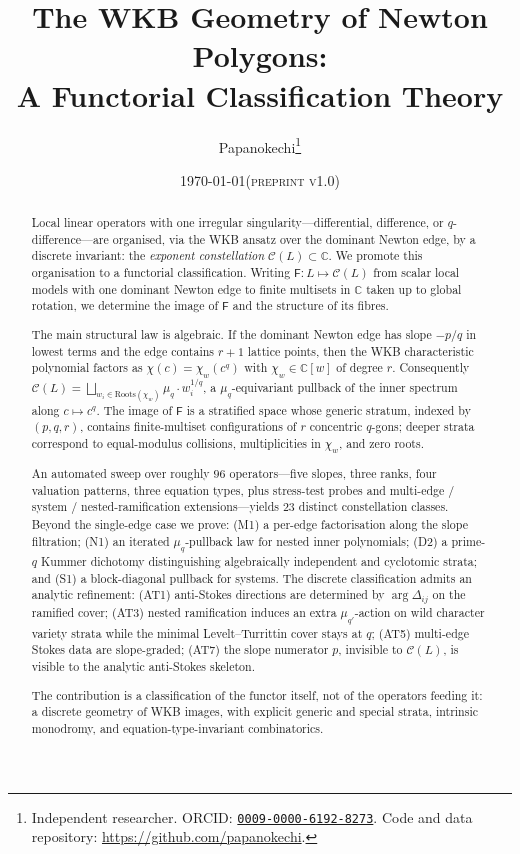 \documentclass[11pt,a4paper]{article}
\title{The WKB Geometry of Newton Polygons:\\
       A Functorial Classification Theory}
\author{%
  Papanokechi\thanks{Independent researcher. ORCID:
  \href{https://orcid.org/0009-0000-6192-8273}{\texttt{0009-0000-6192-8273}}.
  Code and data repository:
  \url{https://github.com/papanokechi}.}
}
\date{\today\hspace{1ex}\textsc{(preprint v1.0)}}
\theoremstyle{plain}
\theoremstyle{definition}
\theoremstyle{remark}
\newcommand{\Roots}{\mathrm{Roots}}
\newcommand{\Cl}{\mathcal{C}}
\newcommand{\Fclass}{\mathsf{F}}
\newcommand{\Dij}{\Delta_{ij}}
\begin{document}
\maketitle

\begin{abstract}
Local linear operators with one irregular singularity---differential,
difference, or $q$-difference---are organised, via the WKB ansatz over the
dominant Newton edge, by a discrete invariant: the \emph{exponent
constellation} $\Cl(L) \subset \mathbb{C}$. We promote this organisation to
a functorial classification. Writing
$\Fclass \colon L \mapsto \Cl(L)$ from scalar local models with one dominant
Newton edge to finite multisets in $\mathbb{C}$ taken up to global rotation,
we determine the image of $\Fclass$ and the structure of its fibres.

The main structural law is algebraic. If the dominant Newton edge has slope
$-p/q$ in lowest terms and the edge contains $r{+}1$ lattice points, then
the WKB characteristic polynomial factors as
$\chi(c) = \chi_w(c^q)$ with $\chi_w \in \mathbb{C}[w]$ of degree $r$.
Consequently
$\Cl(L) = \bigsqcup_{w_i \in \Roots(\chi_w)} \mu_q \cdot w_i^{1/q}$,
a $\mu_q$-equivariant pullback of the inner spectrum along $c \mapsto c^q$.
The image of $\Fclass$ is a stratified space whose generic stratum, indexed
by $(p, q, r)$, contains finite-multiset configurations of $r$ concentric
$q$-gons; deeper strata correspond to equal-modulus collisions, multiplicities
in $\chi_w$, and zero roots.

An automated sweep over roughly $96$ operators---five slopes, three ranks,
four valuation patterns, three equation types, plus stress-test probes and
multi-edge / system / nested-ramification extensions---yields \textbf{$23$}
distinct constellation classes. Beyond the single-edge case we prove:
(M1) a per-edge factorisation along the slope filtration; (N1) an iterated
$\mu_q$-pullback law for nested inner polynomials; (D2) a prime-$q$ Kummer
dichotomy distinguishing algebraically independent and cyclotomic strata;
and (S1) a block-diagonal pullback for systems. The discrete classification
admits an analytic refinement: (AT1) anti-Stokes directions are determined
by $\arg \Dij$ on the ramified cover; (AT3) nested ramification induces an
extra $\mu_{q'}$-action on wild character variety strata while the minimal
Levelt--Turrittin cover stays at $q$; (AT5) multi-edge Stokes data are
slope-graded; (AT7) the slope numerator $p$, invisible to $\Cl(L)$, is
visible to the analytic anti-Stokes skeleton.

The contribution is a classification of the functor itself, not of the
operators feeding it: a discrete geometry of WKB images, with explicit
generic and special strata, intrinsic monodromy, and equation-type-invariant
combinatorics.
\end{abstract}
\end{document}
